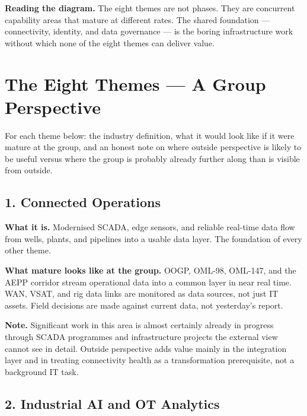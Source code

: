 \documentclass[10pt]{article}
\newcommand{\spacer}{\vspace{10pt}}
\newcommand{\bigspacer}{\vspace{16pt}}
\begin{document}
\spacer
{\small\color{darkgrey}
\textbf{Reading the diagram.}\enspace
The eight themes are not phases. They are concurrent capability areas that
mature at different rates. The shared foundation --- connectivity, identity,
and data governance --- is the boring infrastructure work without which none
of the eight themes can deliver value.
}

\bigspacer

\section{The Eight Themes --- A Group Perspective}

For each theme below: the industry definition, what it would look like if it
were mature at the group, and an honest note on where outside perspective is
likely to be useful versus where the group is probably already further along
than is visible from outside.

\spacer

\subsection*{1. Connected Operations}

\textbf{What it is.} Modernised SCADA, edge sensors, and reliable real-time
data flow from wells, plants, and pipelines into a usable data layer. The
foundation of every other theme.

\textbf{What mature looks like at the group.} OOGP, OML-98, OML-147, and the
AEPP corridor stream operational data into a common layer in near real time.
WAN, VSAT, and rig data links are monitored as data sources, not just IT
assets. Field decisions are made against current data, not yesterday's report.

\textbf{Note.} Significant work in this area is almost certainly already in
progress through SCADA programmes and infrastructure projects the external
view cannot see in detail. Outside perspective adds value mainly in the
integration layer and in treating connectivity health as a transformation
prerequisite, not a background IT task.

\spacer

\subsection*{2. Industrial AI and OT Analytics}
\end{document}
